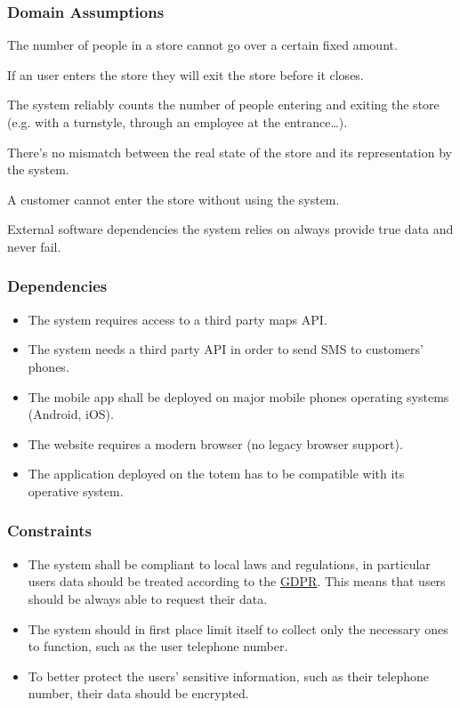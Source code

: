 \subsubsection{Domain Assumptions}
\begin{enumerate}[label={[D\arabic*]}]
    \item The number of people in a store cannot go over a certain fixed amount.
    \item If an user enters the store they will exit the store before it closes.
    \item The system reliably counts the number of people entering and exiting the store (e.g. with a turnstyle, through an employee at the entrance\dots).
    \item There's no mismatch between the real state of the store and its representation by the system.
    \item A customer cannot enter the store without using the system.
    \item External software dependencies the system relies on always provide true data and never fail.
\end{enumerate}

\subsubsection{Dependencies}
\begin{itemize}
    \item The system requires access to a third party maps API.
    \item The system needs a third party API in order to send SMS to customers' phones.
    \item The mobile app shall be deployed on major mobile phones operating systems (Android, iOS).
    \item The website requires a modern browser (no legacy browser support).
    \item The application deployed on the totem has to be compatible with its operative system.
\end{itemize}

\subsubsection{Constraints}
\begin{itemize}
    \item The system shall be compliant to local laws and regulations, in particular users data should
    be treated according to the \href{https://gdpr.eu/}{GDPR}. This means that users should be always able
    to request their data.
    \item The system should in first place limit itself to collect only
    the necessary ones to function, such as the user telephone number.
    \item To better protect the users' sensitive information, such as their telephone number, their data should
    be encrypted.
\end{itemize}